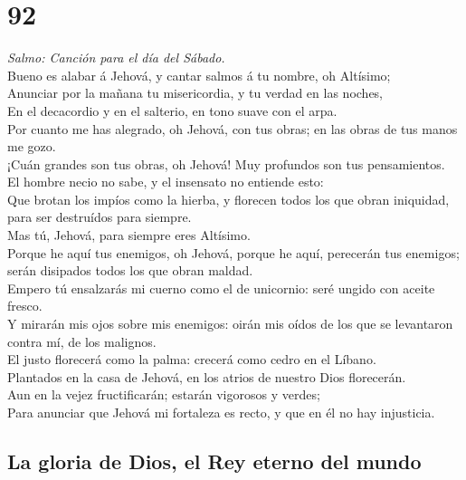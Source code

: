\hypertarget{section-91}{%
\section{92}\label{section-91}}

 \emph{Salmo: Canción para el día del Sábado.}\\
Bueno es alabar á Jehová, y cantar salmos á tu nombre, oh Altísimo;\\
 Anunciar por la mañana tu misericordia, y tu verdad en las
noches,\\
 En el decacordio y en el salterio, en tono suave con el
arpa.\\
 Por cuanto me has alegrado, oh Jehová, con tus obras; en
las obras de tus manos me gozo.\\
 ¡Cuán grandes son tus obras, oh Jehová! Muy profundos son
tus pensamientos.\\
 El hombre necio no sabe, y el insensato no entiende esto:\\
 Que brotan los impíos como la hierba, y florecen todos los
que obran iniquidad, para ser destruídos para siempre.\\
 Mas tú, Jehová, para siempre eres Altísimo.\\
 Porque he aquí tus enemigos, oh Jehová, porque he aquí,
perecerán tus enemigos; serán disipados todos los que obran maldad.\\
 Empero tú ensalzarás mi cuerno como el de unicornio: seré
ungido con aceite fresco.\\
 Y mirarán mis ojos sobre mis enemigos: oirán mis oídos de
los que se levantaron contra mí, de los malignos.\\
 El justo florecerá como la palma: crecerá como cedro en el
Líbano.\\
 Plantados en la casa de Jehová, en los atrios de nuestro
Dios florecerán.\\
 Aun en la vejez fructificarán; estarán vigorosos y
verdes;\\
 Para anunciar que Jehová mi fortaleza es recto, y que en
él no hay injusticia.

\hypertarget{la-gloria-de-dios-el-rey-eterno-del-mundo}{%
\subsection{La gloria de Dios, el Rey eterno del
mundo}\label{la-gloria-de-dios-el-rey-eterno-del-mundo}}

